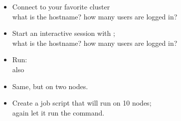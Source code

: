 \begin{exerciseframe}
  \begin{itemize}
  \item Connect to your favorite cluster\\
    what is the hostname? how many users are logged in?
  \item Start an interactive session with ;\\
    what is the hostname? how many users are logged in?
  \item Run: \\
    also 
  \item Same, but  on two nodes.
  \item Create a job script that will run on 10 nodes;\\
    again let it run the  command.
  \end{itemize}
\end{exerciseframe}
